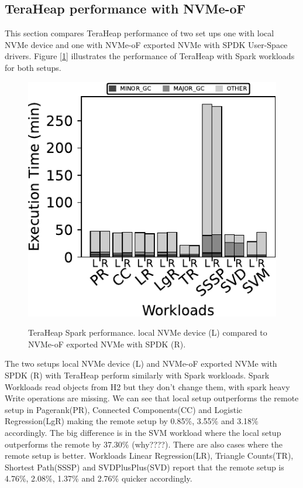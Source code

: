 \subsection{TeraHeap performance with NVMe-oF}
\par This section compares TeraHeap performance of two set ups one with local NVMe device and one with NVMe-oF exported NVMe with SPDK User-Space drivers. Figure [\ref{fig:bench_spark}] illustrates the performance of TeraHeap with Spark workloads for both setups.
\begin{figure}[H]
  \includegraphics[width=\linewidth]{asplos25-Thesis/figures/bench_spark.pdf}\\
\caption{TeraHeap Spark performance. local NVMe device (L) compared to NVMe-oF exported NVMe with SPDK (R).}
\label{fig:bench_spark}
\end{figure}
The two setups local NVMe device (L) and NVMe-oF exported NVMe with SPDK (R) with TeraHeap perform similarly with Spark workloads. Spark Workloads read objects from H2 but they don't change them, with spark heavy Write operations are missing. We can see that local setup outperforms the remote setup in Pagerank(PR), Connected Components(CC) and Logistic Regression(LgR) making the remote setup by 0.85\%, 3.55\% and 3.18\% accordingly. The big difference is in the SVM workload where the local setup outperforms the remote by 37.30\% (why????). There are also cases where the remote setup is better. Workloads Linear Regression(LR), Triangle Counts(TR), Shortest Path(SSSP) and SVDPlusPlus(SVD) report that the remote setup is 4.76\%, 2.08\%, 1.37\% and 2.76\% quicker accordingly.
